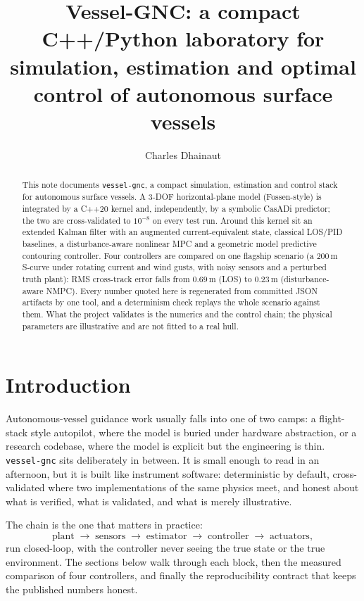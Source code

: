 \documentclass[10pt]{article}
\title{Vessel-GNC: a compact C++/Python laboratory for\\simulation, estimation and optimal control of autonomous surface vessels}
\author{Charles Dhainaut}
\date{}
\begin{document}
\maketitle

\begin{abstract}
This note documents \texttt{vessel-gnc}, a compact simulation, estimation
and control stack for autonomous surface vessels. A 3-DOF horizontal-plane
model (Fossen-style) is integrated by a C++20 kernel and, independently, by
a symbolic CasADi predictor; the two are cross-validated to $10^{-8}$ on
every test run. Around this kernel sit an extended Kalman filter with an
augmented current-equivalent state, classical LOS/PID baselines, a
disturbance-aware nonlinear MPC and a geometric model predictive contouring
controller. Four controllers are compared on one flagship scenario (a
200\,m S-curve under rotating current and wind gusts, with noisy sensors
and a perturbed truth plant): RMS cross-track error falls from
$0.69$\,m (LOS) to $0.23$\,m (disturbance-aware NMPC). Every number quoted
here is regenerated from committed JSON artifacts by one tool, and a
determinism check replays the whole scenario against them. What the
project validates is the numerics and the control chain; the physical
parameters are illustrative and are not fitted to a real hull.
\end{abstract}

\section{Introduction}
Autonomous-vessel guidance work usually falls into one of two camps: a
flight-stack style autopilot, where the model is buried under hardware
abstraction, or a research codebase, where the model is explicit but the
engineering is thin. \texttt{vessel-gnc} sits deliberately in between. It
is small enough to read in an afternoon, but it is built like instrument
software: deterministic by default, cross-validated where two
implementations of the same physics meet, and honest about what is
verified, what is validated, and what is merely illustrative.

The chain is the one that matters in practice:
\begin{equation}
  \text{plant} \;\rightarrow\; \text{sensors} \;\rightarrow\;
  \text{estimator} \;\rightarrow\; \text{controller} \;\rightarrow\;
  \text{actuators},
\end{equation}
run closed-loop, with the controller never seeing the true state or the
true environment. The sections below walk through each block, then the
measured comparison of four controllers, and finally the reproducibility
contract that keeps the published numbers honest.
\end{document}
